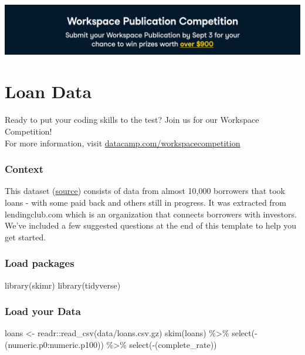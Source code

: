 \documentclass[
]{article}
\author{}
\date{\vspace{-2.5em}}
\newenvironment{Shaded}{\begin{snugshade}}{\end{snugshade}}
\newcommand{\FunctionTok}[1]{\textcolor[rgb]{0.00,0.00,0.00}{#1}}
\newcommand{\NormalTok}[1]{#1}
\newcommand{\OtherTok}[1]{\textcolor[rgb]{0.56,0.35,0.01}{#1}}
\newcommand{\SpecialCharTok}[1]{\textcolor[rgb]{0.00,0.00,0.00}{#1}}
\newcommand{\StringTok}[1]{\textcolor[rgb]{0.31,0.60,0.02}{#1}}
\begin{document}
\includegraphics{banner.png}

\hypertarget{loan-data}{%
\section{Loan Data}\label{loan-data}}

Ready to put your coding skills to the test? Join us for our Workspace
Competition!\\
For more information, visit
\href{https://datacamp.com/workspacecompetition}{datacamp.com/workspacecompetition}

\hypertarget{context}{%
\subsubsection{Context}\label{context}}

This dataset (\href{https://www.kaggle.com/itssuru/loan-data}{source})
consists of data from almost 10,000 borrowers that took loans - with
some paid back and others still in progress. It was extracted from
lendingclub.com which is an organization that connects borrowers with
investors. We've included a few suggested questions at the end of this
template to help you get started.

\hypertarget{load-packages}{%
\subsubsection{Load packages}\label{load-packages}}

\begin{Shaded}
\begin{Highlighting}[]
\FunctionTok{library}\NormalTok{(skimr)}
\FunctionTok{library}\NormalTok{(tidyverse)}
\end{Highlighting}
\end{Shaded}

\hypertarget{load-your-data}{%
\subsubsection{Load your Data}\label{load-your-data}}

\begin{Shaded}
\begin{Highlighting}[]
\NormalTok{loans }\OtherTok{\textless{}{-}}\NormalTok{ readr}\SpecialCharTok{::}\FunctionTok{read\_csv}\NormalTok{(}\StringTok{\textquotesingle{}data/loans.csv.gz\textquotesingle{}}\NormalTok{)}
\FunctionTok{skim}\NormalTok{(loans) }\SpecialCharTok{\%\textgreater{}\%} 
  \FunctionTok{select}\NormalTok{(}\SpecialCharTok{{-}}\NormalTok{(numeric.p0}\SpecialCharTok{:}\NormalTok{numeric.p100)) }\SpecialCharTok{\%\textgreater{}\%}
  \FunctionTok{select}\NormalTok{(}\SpecialCharTok{{-}}\NormalTok{(complete\_rate))}
\end{Highlighting}
\end{Shaded}
\end{document}
